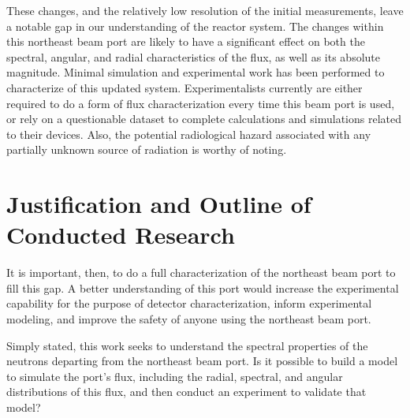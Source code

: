 These changes, and the relatively low resolution of the initial measurements, leave a notable gap in our understanding of the reactor system.
The changes within this northeast beam port are likely to have a significant effect on both the spectral, angular, and radial characteristics of the flux, as well as its absolute magnitude.
Minimal simulation and experimental work has been performed to characterize of this updated system.
Experimentalists currently are either required to do a form of flux characterization every time this beam port is used, or rely on a questionable dataset to complete calculations and simulations related to their devices.
Also, the potential radiological hazard associated with any partially unknown source of radiation is worthy of noting.



\section{Justification and Outline of Conducted Research}
It is important, then, to do a full characterization of the northeast beam port to fill this gap.
A better understanding of this port would increase the experimental capability for the purpose of detector characterization, inform experimental modeling, and improve the safety of anyone using the northeast beam port.

Simply stated, this work seeks to understand the spectral properties of the neutrons departing from the northeast beam port.
Is it possible to build a model to simulate the port's flux, including the radial, spectral, and angular distributions of this flux, and then conduct an experiment to validate that model?

